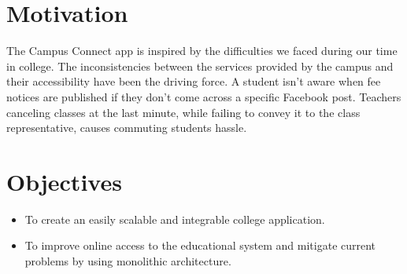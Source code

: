 \section{Motivation}
The Campus Connect app is inspired by the difficulties we faced during our time in college. The inconsistencies between the services provided by the campus and their accessibility have been the driving force. A student isn’t aware when fee notices are published if they don’t come across a specific Facebook post. Teachers canceling classes at the last minute, while failing to convey it to the class representative, causes commuting students hassle.

\section{Objectives}
\begin{itemize}
    \item To create an easily scalable and integrable college application.
    \item To improve online access to the educational system and mitigate current problems by using monolithic architecture.
\end{itemize}